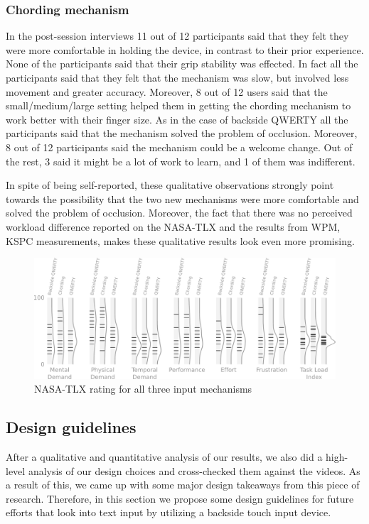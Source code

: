 \subsubsection{Chording mechanism}
In the post-session interviews 11 out of 12 participants said that they felt they were more comfortable in holding the device, in contrast to their prior experience. None of the participants said that their grip stability was effected. In fact all the participants said that they felt that the mechanism was slow, but involved less movement and greater accuracy. Moreover, 8 out of 12 users said that the small/medium/large setting helped them in getting the chording mechanism to work better with their finger size. As in the case of backside QWERTY all the participants said that the mechanism solved the problem of occlusion. Moreover, 8 out of 12 participants said the mechanism could be a welcome change. Out of the rest, 3 said it might be a lot of work to learn, and 1 of them was indifferent.

In spite of being self-reported, these qualitative observations strongly point towards the possibility that the two new mechanisms were more comfortable and solved the problem of occlusion. Moreover, the fact that there was no perceived workload difference reported on the NASA-TLX and the results from WPM, KSPC measurements, makes these qualitative results look even more promising.

\begin{figure}
    \includegraphics[width=\textwidth]{Figures/hash_and_densities_index.pdf} 
    \caption{NASA-TLX rating for all three input mechanisms}
    \label{fig:tlx-ratings}
\end{figure}

\subsection{Design guidelines}

After a qualitative and quantitative analysis of our results, we also did a high-level analysis of our design choices and cross-checked them against the videos. As a result of this, we came up with some major design takeaways from this piece of research. Therefore, in this section we propose some design guidelines for future efforts that look into text input by utilizing a backside touch input device. 


